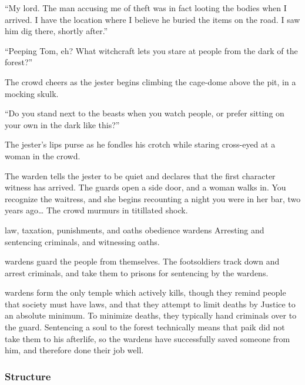 \begin{multicols}{2}
{    ``My lord.
    The man accusing me of theft was in fact looting the bodies when I arrived.
    I have the location where I believe he buried the items on the road.
    I saw him dig there, shortly after.''

    {\sffamily ``Peeping Tom, eh?
    What witchcraft lets you stare at people from the dark of the forest?''}

    The crowd cheers as the jester begins climbing the cage-dome above the pit, in a mocking skulk.

    {\sffamily ``Do you stand next to the beasts when you watch people, or prefer sitting on your own in the dark like this?''}

    The jester's lips purse as he fondles his crotch while staring cross-eyed at a woman in the crowd.

    The \gls{warden} tells the jester to be quiet and declares that the first character witness has arrived.
    The guards open a side door, and a woman walks in.
    You recognize the waitress, and she begins recounting a night you were in her bar, two years ago\ldots
    The crowd murmurs in titillated shock.
  }%
  {law, taxation, punishments, and oaths}%
  {obedience}%
  {\Glspl{warden}}%
  {
    Arresting and sentencing criminals, and witnessing oaths.
  }%

\Glspl{warden} guard the people from themselves.
The footsoldiers track down and arrest criminals, and take them to prisons for sentencing by the \glspl{warden}.

\Glspl{warden} form the only temple which actively kills, though they remind people that society must have laws, and that they attempt to limit deaths by Justice to an absolute minimum.
To minimize deaths, they typically hand criminals over to the \gls{guard}.
Sentencing a soul to the forest technically means that \gls{paik} did not take them to his afterlife, so the \glspl{warden} have successfully saved someone from him, and therefore done their job well.

\subsubsection{Structure}


\end{multicols}
